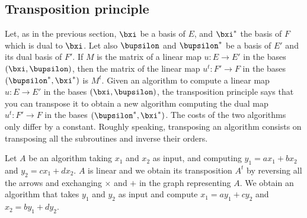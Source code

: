 \documentclass[a4paper,11pt]{article}
\theoremstyle{break}
\theoremstyle{definition}
\theoremstyle{remark}
\begin{document}
\subsection{Transposition principle}
Let, as in the previous section, $\bxi$ be a basis of $E$, and $\bxi^*$ the
basis of $F$ which is dual to $\bxi$. Let also $\bupsilon$ and $\bupsilon^*$ be 
a
basis of $E'$ and its dual basis of $F'$. If $M$ is the matrix of a linear map
$u:E\rightarrow E'$ in the
bases $(\bxi,\bupsilon)$, then the matrix of the linear map $u^t:F'\rightarrow 
F$ in the bases
$(\bupsilon^*,\bxi^*)$ is $M^t$. Given an algorithm to compute a linear map
$u:E\rightarrow E'$ in the bases $(\bxi,\bupsilon)$, the transposition principle
says that you can transpose it to obtain a new algorithm computing the dual map 
$u^t:F'\rightarrow F$ in the bases
$(\bupsilon^*,\bxi^*)$. The costs of the two algorithms only differ by a
constant. Roughly speaking, transposing an algorithm consists on transposing all
the subroutines and inverse their orders.

Let $A$ be an algorithm taking $x_1$ and $x_2$ as input, and computing 
$y_1=ax_1+bx_2$ and $y_2=cx_1+dx_2$. $A$ is linear and we obtain its 
transposition $A^t$ by reversing all the arrows and exchanging $\times$ and $+$ 
in the graph representing $A$. We obtain an algorithm that takes $y_1$ and 
$y_2$ as input and compute $x_1=ay_1+cy_2$ and $x_2=by_1+dy_2$.


\end{document}
